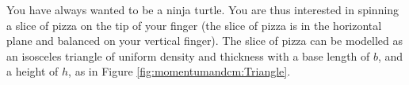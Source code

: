 \question You have always wanted to be a ninja turtle. You are thus interested in spinning a slice of pizza on the tip of your finger (the slice of pizza is in the horizontal plane and balanced on your vertical finger). The slice of pizza can be modelled as an isosceles triangle of uniform density and thickness with a base length of $b$, and a height of $h$, as in Figure \ref{fig:momentumandcm:Triangle}.


